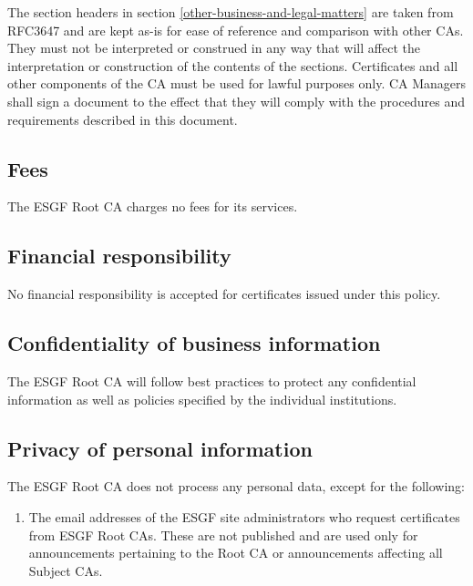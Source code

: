The section headers in section \ref{other-business-and-legal-matters} are taken from RFC3647 and are kept
as-is for ease of reference and comparison with other CAs. They must not
be interpreted or construed in any way that will affect the
interpretation or construction of the contents of the sections.
Certificates and all other components of the CA must be used for lawful
purposes only. CA Managers shall sign a document to the effect that they
will comply with the procedures and requirements described in this
document.

\subsection{Fees}\label{fees}

The ESGF Root CA charges no fees for its services.

\subsection{Financial responsibility}\label{financial-responsibility}

No financial responsibility is accepted for certificates issued under
this policy.

\subsection{Confidentiality of business information}\label{confidentiality-of-business-information}

The ESGF Root CA will follow best practices to protect any
confidential information as well as policies specified by the individual institutions.

\subsection{Privacy of personal information}\label{privacy-of-personal-information}

The ESGF Root CA does not process any personal data, except for the
following:

\begin{enumerate}
\item
  
  The email addresses of the ESGF site administrators who request certificates from ESGF Root CAs. These are not published and are used only for announcements pertaining
  to the Root CA or announcements affecting all Subject CAs.
  
\end{enumerate}

